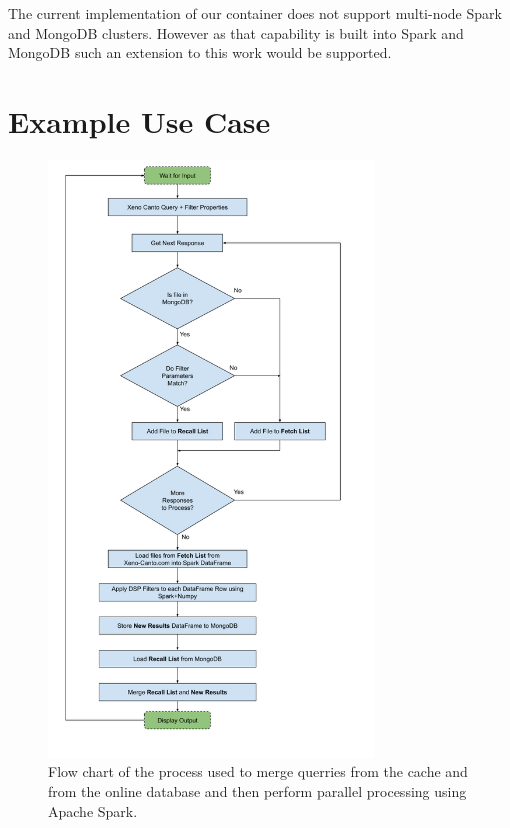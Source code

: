 \documentclass[conference,twoside]{IEEEtran}
\begin{document}
The current implementation of our container does not support multi-node Spark and MongoDB clusters. However as that capability is built into Spark and MongoDB such an extension to this work would be supported.


\section{Example Use Case}
\begin{figure}
  \centering
  \includegraphics[width=3.4in]{project_flow_chart}
  \caption{Flow chart of the process used to merge querries from the cache and from the online database and then perform parallel processing using Apache Spark.}
  \label{fig:flow}
\end{figure}
\end{document}
